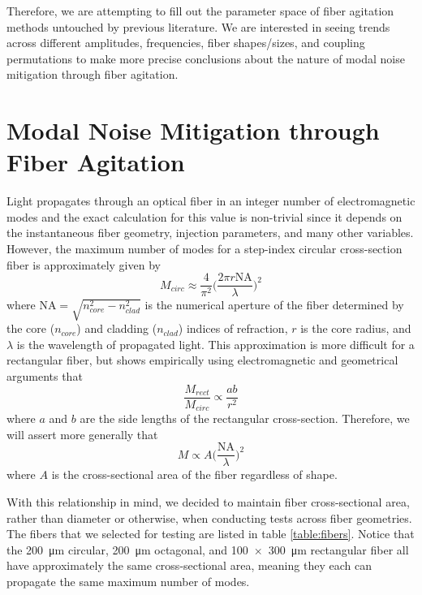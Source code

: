 \documentclass[twocolumn]{emulateapj}
\begin{document}
Therefore, we are attempting to fill out the parameter space of fiber agitation methods untouched by previous literature. We are interested in seeing trends across different amplitudes, frequencies, fiber shapes/sizes, and coupling permutations to make more precise conclusions about the nature of modal noise mitigation through fiber agitation.

\section{Modal Noise Mitigation through Fiber Agitation}
\label{sec:fiber_agitation}

Light propagates through an optical fiber in an integer number of electromagnetic modes and the exact calculation for this value is non-trivial since it depends on the instantaneous fiber geometry, injection parameters, and many other variables. However, the maximum number of modes for a step-index circular cross-section fiber is approximately given by
\begin{equation}
M_{circ} \approx \frac{4}{\pi ^2} \Bigg( \frac{2 \pi r \textrm{NA}}{\lambda} \Bigg) ^2
\end{equation}
where $\textrm{NA} = \sqrt{n_{core}^2 - n_{clad}^2}$ is the numerical aperture of the fiber determined by the core ($n_{core}$) and cladding ($n_{clad}$) indices of refraction, $r$ is the core radius, and $\lambda$ is the wavelength of propagated light. This approximation is more difficult for a rectangular fiber, but \cite{Nikitin2011} shows empirically using electromagnetic and geometrical arguments that
\begin{equation}
\frac{M_{rect}}{M_{circ}} \propto \frac{ab}{r^2}
\end{equation}
where $a$ and $b$ are the side lengths of the rectangular cross-section. Therefore, we will assert more generally that
\begin{equation}
M \propto A \Bigg( \frac{\textrm{NA}}{\lambda} \Bigg) ^2
\end{equation}
where $A$ is the cross-sectional area of the fiber regardless of shape.


With this relationship in mind, we decided to maintain fiber cross-sectional area, rather than diameter or otherwise, when conducting tests across fiber geometries. The fibers that we selected for testing are listed in table \ref{table:fibers}. Notice that the \SI{200}{\micro\meter} circular, \SI{200}{\micro\meter} octagonal, and \SI{100x300}{\micro\meter} rectangular fiber all have approximately the same cross-sectional area, meaning they each can propagate the same maximum number of modes.
\end{document}
